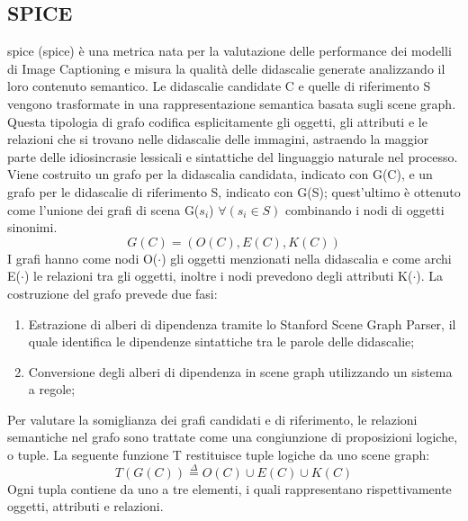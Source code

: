 \subsection{SPICE}
\acrshort{spice} (\acrlong{spice}) \cite{anderson2016spice} è una metrica nata per la valutazione delle performance dei modelli di Image Captioning e misura la qualità delle didascalie generate analizzando il loro contenuto semantico.
Le didascalie candidate C e quelle di riferimento S vengono trasformate in una rappresentazione semantica basata sugli scene graph. Questa tipologia di grafo codifica esplicitamente gli oggetti, gli attributi e le relazioni che si trovano nelle didascalie delle immagini, astraendo la maggior parte delle idiosincrasie lessicali e sintattiche del linguaggio naturale nel processo.
Viene costruito un grafo per la didascalia candidata, indicato con G(C), e un grafo per le didascalie di riferimento S, indicato con G(S); quest'ultimo è ottenuto come l'unione dei grafi di scena G($s_i$) $\forall(s_i \in S)$ combinando i nodi di oggetti sinonimi.
\begin{equation*}
G(C) = (O(C), E(C), K(C))
\end{equation*}
I grafi hanno come nodi O($\cdot$) gli oggetti menzionati nella didascalia e come archi E($\cdot$) le relazioni tra gli oggetti, inoltre i nodi prevedono degli attributi K($\cdot$).
La costruzione del grafo prevede due fasi:
\begin{enumerate}
\item Estrazione di alberi di dipendenza tramite lo Stanford Scene Graph Parser, il quale identifica le dipendenze sintattiche tra le parole delle didascalie;
\item Conversione degli alberi di dipendenza in scene graph utilizzando un sistema a regole;
\end{enumerate}
Per valutare la somiglianza dei grafi candidati e di riferimento, le relazioni semantiche nel grafo sono trattate come una congiunzione di proposizioni logiche, o tuple. La seguente funzione T restituisce tuple logiche da uno scene graph:
\begin{equation*}
T(G(C))  \stackrel{\Delta}{=} O(C) \cup E(C) \cup K(C)
\end{equation*}
Ogni tupla contiene da uno a tre elementi, i quali rappresentano rispettivamente oggetti, attributi e relazioni.
